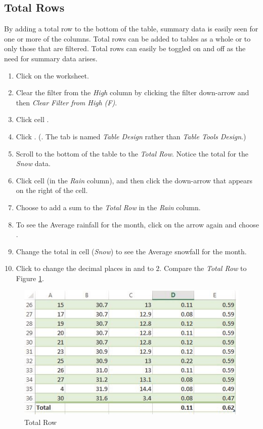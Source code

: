 \subsection{Total Rows}

By adding a total row to the bottom of the table, summary data is easily seen for one or more of the columns. Total rows can be added to tables as a whole or to only those that are filtered. Total rows can easily be toggled on and off as the need for summary data arises.

\begin{enumbox}
	\begin{enumerate}
		\item Click on the  worksheet.
		\item Clear the filter from the \textit{High} column by clicking the filter down-arrow and then \textit{Clear Filter from High (\textdegree F)}.
		\item Click cell .
		\item Click . (. The tab is named \textit{Table Design} rather than \textit{Table Tools Design}.)
		\item Scroll to the bottom of the table to the \textit{Total Row}. Notice the total for the \textit{Snow} data.
		\item Click cell  (in the \textit{Rain} column), and then click the down-arrow that appears on the right of the cell.
		\item Choose  to add a sum to the \textit{Total Row} in the \textit{Rain} column.
		\item To see the Average rainfall for the month, click on the arrow again and choose .
		\item Change the total in cell  (\textit{Snow}) to see the Average snowfall for the month.
		\item Click  to change the decimal places in  and  to $ 2 $. Compare the \textit{Total Row} to Figure \ref{05:fig22}.
	\end{enumerate}
\end{enumbox}
	
\begin{figure}[H]
	\centering
	\includegraphics[width=\maxwidth{.95\linewidth}]{gfx/ch05_fig22}
	\caption{Total Row}
	\label{05:fig22}
\end{figure}

